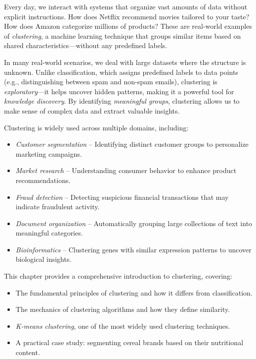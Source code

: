 \documentclass[
  11pt,
]{book}
\providecommand{\tightlist}{%
  \setlength{\itemsep}{0pt}\setlength{\parskip}{0pt}}
\theoremstyle{definition}
\theoremstyle{definition}
\theoremstyle{definition}
\theoremstyle{definition}
\theoremstyle{remark}
\begin{document}
Every day, we interact with systems that organize vast amounts of data without explicit instructions. How does Netflix recommend movies tailored to your taste? How does Amazon categorize millions of products? These are real-world examples of \emph{clustering}, a machine learning technique that groups similar items based on shared characteristics---without any predefined labels.

In many real-world scenarios, we deal with large datasets where the structure is unknown. Unlike classification, which assigns predefined labels to data points (e.g., distinguishing between spam and non-spam emails), clustering is \emph{exploratory}---it helps uncover hidden patterns, making it a powerful tool for \emph{knowledge discovery}. By identifying \emph{meaningful groups}, clustering allows us to make sense of complex data and extract valuable insights.

Clustering is widely used across multiple domains, including:

\begin{itemize}
\tightlist
\item
  \emph{Customer segmentation} -- Identifying distinct customer groups to personalize marketing campaigns.\\
\item
  \emph{Market research} -- Understanding consumer behavior to enhance product recommendations.\\
\item
  \emph{Fraud detection} -- Detecting suspicious financial transactions that may indicate fraudulent activity.\\
\item
  \emph{Document organization} -- Automatically grouping large collections of text into meaningful categories.\\
\item
  \emph{Bioinformatics} -- Clustering genes with similar expression patterns to uncover biological insights.
\end{itemize}

This chapter provides a comprehensive introduction to clustering, covering:

\begin{itemize}
\tightlist
\item
  The fundamental principles of clustering and how it differs from classification.\\
\item
  The mechanics of clustering algorithms and how they define similarity.\\
\item
  \emph{K-means clustering}, one of the most widely used clustering techniques.\\
\item
  A practical case study: segmenting cereal brands based on their nutritional content.
\end{itemize}
\end{document}
